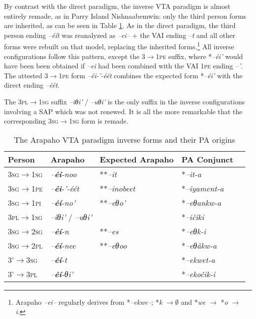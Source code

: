\documentclass[twoside,a4paper,11pt]{article}
\newcommand{\ipa}[1]{{\phon\textit{#1}}}
\newcommand{\sg}{\textsc{sg}}
\newcommand{\pl}{\textsc{pl}}
\newcommand{\grise}[1]{\cellcolor{lightgray}\textbf{#1}}
\newcommand{\pli}{\textsc{pi}}
\newcommand{\pe}{\textsc{pe}}
\begin{document}
By contrast with the direct paradigm, the inverse VTA paradigm is almost entirely remade, as in Parry Island Nishnaabemwin: only the third person forms are inherited, as can be seen in Table \ref{tab:arapaho.vta.2}. As in the direct paradigm, the third person ending \ipa{--éít} was reanalyzed as \ipa{--ei--} + the VAI ending \ipa{--t} and all other forms were rebuilt on that model, replacing the inherited forms.\footnote{Arapaho \ipa{--ei--} regularly derives from *\ipa{--ekwe--}; *\ipa{k} $\rightarrow \emptyset $ and *\ipa{we} $\rightarrow $ *\ipa{o} $\rightarrow $ \ipa{i}. } All inverse configurations follow this pattern, except the 3$\rightarrow$1\pe{} suffix, where *\ipa{--éi'} would have been been obtained if \ipa{--ei} had been combined with the VAI 1\pe{} ending \ipa{--'}. The attested 3$\rightarrow$1\pe{} form \ipa{--éi-'-éét} combines the expected form *\ipa{--éi'} with the direct ending \ipa{--éét}.

The 3\pl{}$\rightarrow$1\sg{} suffix	 \ipa{--iθi'} /	\ipa{--uθi'} is the only  suffix in the inverse configurations involving a SAP which was not renewed. It is all the more remarkable that the corresponding 3\sg{}$\rightarrow$1\sg{} form is remade.

\begin{table}[H]
\caption{The Arapaho VTA paradigm inverse forms and their PA origins}
\centering \label{tab:arapaho.vta.2}
\begin{tabular}{lllll}
\toprule
Person & Arapaho & Expected Arapaho&PA Conjunct    \\
\midrule
3\sg{}$\rightarrow$1\sg{} & 	\ipa{--\textbf{éí}-noo}\grise{} &   **\ipa{--it}&	*\ipa{--it-a} & 		\\
3\sg{}$\rightarrow$1\pe{} & 	\ipa{--\textbf{éi}-'-éét} \grise{}&**\ipa{--inobeet}& *\ipa{--iyament-a} & 		\\
3\sg{}$\rightarrow$1\pli{} & 	\ipa{--\textbf{éí}-no'} \grise{}& 	**\ipa{--eθo'}&*\ipa{--eθankw-a} & 		\\
\midrule
3\pl{}$\rightarrow$1\sg{} & 	 \ipa{--iθi'} /	\ipa{--uθi'} &    &	*\ipa{--ičiki} & 		\\
\midrule
3\sg{}$\rightarrow$2\sg{} & 	\ipa{--\textbf{éí}-n} \grise{}&**\ipa{--es}& *\ipa{--eθk-i} & 		\\
3\sg{}$\rightarrow$2\pl{} & 	\ipa{--\textbf{éí}-nee} \grise{}& **\ipa{--eθoo}&*\ipa{--eθâkw-a} & 		\\
\midrule
3'$\rightarrow$3\sg{} & 	\ipa{--\textbf{éí}-t} & &	*\ipa{--ekwet-a} & 		\\
3'$\rightarrow$3\pl{} & 	\ipa{--\textbf{éí}-θi'} & &	*\ipa{--ekočik-i} & 		\\
\bottomrule
\end{tabular}
\end{table}
\end{document}
